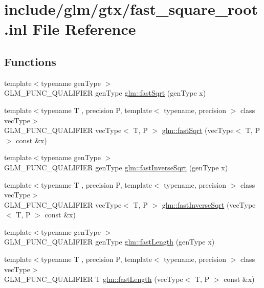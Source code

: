 \hypertarget{fast__square__root_8inl}{}\section{include/glm/gtx/fast\+\_\+square\+\_\+root.inl File Reference}
\label{fast__square__root_8inl}
\subsection*{Functions}
\begin{DoxyCompactItemize}
\item 
{\footnotesize template$<$typename gen\+Type $>$ }\\G\+L\+M\+\_\+\+F\+U\+N\+C\+\_\+\+Q\+U\+A\+L\+I\+F\+I\+ER gen\+Type \hyperlink{group__gtx__fast__square__root_ga6c460e9414a50b2fc455c8f64c86cdc9}{glm\+::fast\+Sqrt} (gen\+Type x)
\item 
{\footnotesize template$<$typename T , precision P, template$<$ typename, precision $>$ class vec\+Type$>$ }\\G\+L\+M\+\_\+\+F\+U\+N\+C\+\_\+\+Q\+U\+A\+L\+I\+F\+I\+ER vec\+Type$<$ T, P $>$ \hyperlink{group__gtx__fast__square__root_gaad9f601bbc3faa04dda384e4c4e1592c}{glm\+::fast\+Sqrt} (vec\+Type$<$ T, P $>$ const \&x)
\item 
{\footnotesize template$<$typename gen\+Type $>$ }\\G\+L\+M\+\_\+\+F\+U\+N\+C\+\_\+\+Q\+U\+A\+L\+I\+F\+I\+ER gen\+Type \hyperlink{group__gtx__fast__square__root_ga7f081b14d9c7035c8714eba5f7f75a8f}{glm\+::fast\+Inverse\+Sqrt} (gen\+Type x)
\item 
{\footnotesize template$<$typename T , precision P, template$<$ typename, precision $>$ class vec\+Type$>$ }\\G\+L\+M\+\_\+\+F\+U\+N\+C\+\_\+\+Q\+U\+A\+L\+I\+F\+I\+ER vec\+Type$<$ T, P $>$ \hyperlink{group__gtx__fast__square__root_ga903878071f92e51e551791e584a171a1}{glm\+::fast\+Inverse\+Sqrt} (vec\+Type$<$ T, P $>$ const \&x)
\item 
{\footnotesize template$<$typename gen\+Type $>$ }\\G\+L\+M\+\_\+\+F\+U\+N\+C\+\_\+\+Q\+U\+A\+L\+I\+F\+I\+ER gen\+Type \hyperlink{group__gtx__fast__square__root_gafe697d6287719538346bbdf8b1367c59}{glm\+::fast\+Length} (gen\+Type x)
\item 
{\footnotesize template$<$typename T , precision P, template$<$ typename, precision $>$ class vec\+Type$>$ }\\G\+L\+M\+\_\+\+F\+U\+N\+C\+\_\+\+Q\+U\+A\+L\+I\+F\+I\+ER T \hyperlink{group__gtx__fast__square__root_gae28a3099cbd6404a4ea8ef22147ed7b0}{glm\+::fast\+Length} (vec\+Type$<$ T, P $>$ const \&x)

\end{DoxyCompactItemize}
